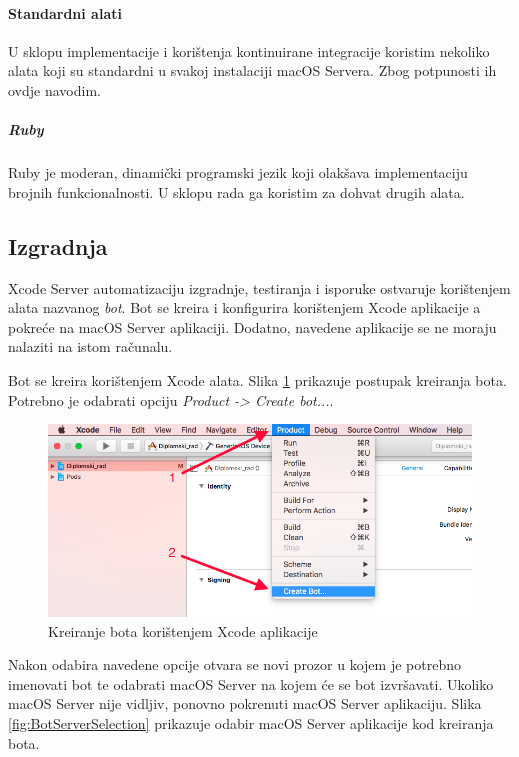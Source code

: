 \documentclass[times, utf8, diplomski, numeric]{fer}
\begin{document}
\begin{appendices}
\paragraph{Standardni alati}

U sklopu implementacije i korištenja kontinuirane integracije koristim nekoliko alata koji su standardni u svakoj instalaciji macOS Servera. Zbog potpunosti ih ovdje navodim.

\subparagraph{Ruby}

Ruby je moderan, dinamički programski jezik koji olakšava implementaciju brojnih funkcionalnosti\citep{ruby}. U sklopu rada ga koristim za dohvat drugih alata.

\subsection{Izgradnja}

Xcode Server automatizaciju izgradnje, testiranja i isporuke ostvaruje korištenjem alata nazvanog \textit{bot}. Bot se kreira i konfigurira korištenjem Xcode aplikacije a pokreće na macOS Server aplikaciji. Dodatno, navedene aplikacije se ne moraju nalaziti na istom računalu.

Bot se kreira korištenjem Xcode alata. Slika \ref{fig:BotCreation} prikazuje postupak kreiranja bota. Potrebno je odabrati opciju \textit{Product -> Create bot...}.

\begin{figure}
\centering
\includegraphics[scale=0.4]{BotCreation}
\caption{Kreiranje bota korištenjem Xcode aplikacije}
\label{fig:BotCreation}
\end{figure}

Nakon odabira navedene opcije otvara se novi prozor u kojem je potrebno imenovati bot te odabrati macOS Server na kojem će se bot izvršavati. Ukoliko macOS Server nije vidljiv, ponovno pokrenuti macOS Server aplikaciju. Slika \ref{fig:BotServerSelection} prikazuje odabir macOS Server aplikacije kod kreiranja bota.


\end{appendices}
\end{document}
